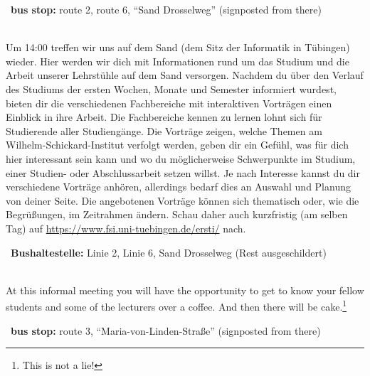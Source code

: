 \begin{description}
	    ~\textbf{bus stop:} route 2, route 6, "`Sand Drosselweg"' (signposted from there)
    \else
	    \item[Freitag, 11. Oktober \YEAR, 14 Uhr, Sand 1, Foyer (Räume und Programm folgen)]\ \\
    	Um 14:00 treffen wir uns auf dem Sand (dem Sitz der Informatik in Tübingen) wieder. Hier werden wir dich mit Informationen rund um das Studium und die Arbeit unserer Lehrstühle auf dem Sand versorgen.
    	Nachdem du über den Verlauf des Studiums der ersten Wochen, Monate und Semester informiert wurdest, bieten dir die verschiedenen Fachbereiche mit interaktiven Vorträgen einen Einblick in ihre Arbeit. Die Fachbereiche kennen zu lernen lohnt sich für Studierende aller Studiengänge. Die Vorträge zeigen, welche Themen am Wilhelm-Schickard-Institut verfolgt werden, geben dir ein Gefühl, was für dich hier interessant sein kann und wo du möglicherweise Schwerpunkte im Studium, einer Studien- oder Abschlussarbeit setzen willst. Je nach Interesse kannst du dir verschiedene Vorträge anhören, allerdings bedarf dies an Auswahl und Planung von deiner Seite. Die angebotenen Vorträge können sich thematisch oder, wie die Begrüßungen, im Zeitrahmen ändern. Schau daher auch kurzfristig (am selben Tag) auf \url{https://www.fsi.uni-tuebingen.de/ersti/} nach.

        ~\textbf{Bushaltestelle:} Linie 2, Linie 6, Sand Drosselweg (Rest ausgeschildert)
    \fi
\fi

\ifmaster
    \ifml
        \item[Friday, October 11th \YEAR, 11:00, Maria-von-Linden-Straße 6]\ \\
    At this informal meeting you will have the opportunity to get to know your fellow students and some of the lecturers over a coffee. And then there will be cake.\footnote{This is not a lie!}

        ~\textbf{bus stop:} route 3, "`Maria-von-Linden-Straße"' (signposted from there)
    \else

    \fi
\fi


\end{description}
